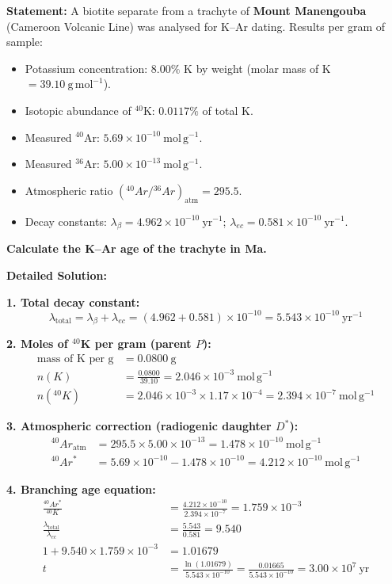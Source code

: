 \documentclass[11pt]{article}
\begin{document}
\begin{exoresolu}
\textbf{Statement:} A biotite separate from a trachyte of \textbf{Mount Manengouba} (Cameroon Volcanic Line) was analysed for K--Ar dating. Results per gram of sample:
\begin{itemize}
    \item Potassium concentration: $8.00\%$ K by weight (molar mass of K $= 39.10\ \mathrm{g\,mol^{-1}}$).
    \item Isotopic abundance of $^{40}$K: $0.0117\%$ of total K.
    \item Measured $^{40}$Ar: $5.69 \times 10^{-10}\ \mathrm{mol\,g^{-1}}$.
    \item Measured $^{36}$Ar: $5.00 \times 10^{-13}\ \mathrm{mol\,g^{-1}}$.
    \item Atmospheric ratio $({}^{40}Ar/{}^{36}Ar)_{\text{atm}} = 295.5$.
    \item Decay constants: $\lambda_{\beta} = 4.962 \times 10^{-10}\ \mathrm{yr^{-1}}$; $\lambda_{ec} = 0.581 \times 10^{-10}\ \mathrm{yr^{-1}}$.
\end{itemize}
\textbf{Calculate the K--Ar age of the trachyte in Ma.}

\tcblower
\textbf{Detailed Solution:}

\textbf{1. Total decay constant:}
\[ \lambda_{\text{total}} = \lambda_{\beta} + \lambda_{ec} = (4.962 + 0.581) \times 10^{-10} = 5.543 \times 10^{-10}\ \mathrm{yr^{-1}} \]

\textbf{2. Moles of $^{40}$K per gram (parent $P$):}
\begin{align*}
\text{mass of K per g} &= 0.0800\ \mathrm{g} \\
n(K) &= \frac{0.0800}{39.10} = 2.046 \times 10^{-3}\ \mathrm{mol\,g^{-1}} \\
n({}^{40}K) &= 2.046 \times 10^{-3} \times 1.17 \times 10^{-4} = 2.394 \times 10^{-7}\ \mathrm{mol\,g^{-1}}
\end{align*}

\textbf{3. Atmospheric correction (radiogenic daughter $D^{*}$):}
\begin{align*}
{}^{40}Ar_{\text{atm}} &= 295.5 \times 5.00 \times 10^{-13} = 1.478 \times 10^{-10}\ \mathrm{mol\,g^{-1}} \\
{}^{40}Ar^{*} &= 5.69 \times 10^{-10} - 1.478 \times 10^{-10} = 4.212 \times 10^{-10}\ \mathrm{mol\,g^{-1}}
\end{align*}

\textbf{4. Branching age equation:}
\begin{align*}
\frac{{}^{40}Ar^{*}}{{}^{40}K} &= \frac{4.212 \times 10^{-10}}{2.394 \times 10^{-7}} = 1.759 \times 10^{-3} \\
\frac{\lambda_{\text{total}}}{\lambda_{ec}} &= \frac{5.543}{0.581} = 9.540 \\
1 + 9.540 \times 1.759 \times 10^{-3} &= 1.01679 \\
t &= \frac{\ln(1.01679)}{5.543 \times 10^{-10}} = \frac{0.01665}{5.543 \times 10^{-10}} = 3.00 \times 10^{7}\ \mathrm{yr}
\end{align*}


\end{exoresolu}
\end{document}
